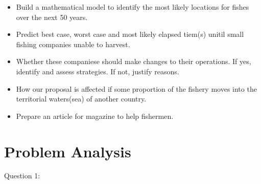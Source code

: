 \documentclass{mcmthesis}
\numberwithin{figure}{section}
\numberwithin{table}{section}
\begin{document}




\begin{itemize}
  \item Build a mathematical model to identify the most likely locations for fishes over the next 50 years.
  \item Predict best case, worst case and most likely elapsed tiem(s) unitil small fishing companies unable to harvest.
  \item Whether these companiese should make changes to their operations. If yes, identify and assess strategies. If not, justify reasons.
  
 \item How our proposal is affected if some proportion of the fishery moves into the territorial waters(sea) of another country.
 \item Prepare an article for magazine to help fishermen.
\end{itemize}

\section{Problem Analysis}
Question 1: 
\end{document}
